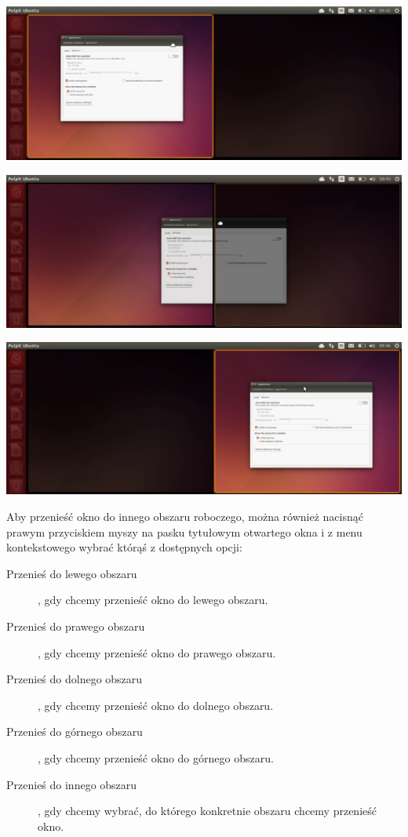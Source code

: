 \begin{center}
	\includegraphics[scale=0.35]{images/unity_okno_przenoszenie1.png}
\end{center}

\begin{center}
	\includegraphics[scale=0.35]{images/unity_okno_przenoszenie2.png}
\end{center}

\begin{center}
	\includegraphics[scale=0.35]{images/unity_okno_przenoszenie3.png}
\end{center}
\clearpage
Aby przenieść okno do innego obszaru roboczego, można również nacisnąć prawym przyciskiem myszy na pasku tytułowym otwartego okna i z menu kontekstowego wybrać którąś z dostępnych opcji:
\begin{description}
\item[Przenieś do lewego obszaru], gdy chcemy przenieść okno do lewego obszaru.
\item[Przenieś do prawego obszaru], gdy chcemy przenieść okno do prawego obszaru.
\item[Przenieś do dolnego obszaru], gdy chcemy przenieść okno do dolnego obszaru.
\item[Przenieś do górnego obszaru], gdy chcemy przenieść okno do górnego obszaru.
\item[Przenieś do innego obszaru], gdy chcemy wybrać, do którego konkretnie obszaru chcemy przenieść
okno.
\end{description}

